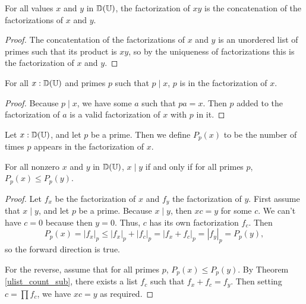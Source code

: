 \documentclass[../../math.tex]{subfiles}
\begin{document}
\begin{theorem} \label{factorization_mult}
    For all values $x$ and $y$ in $\mathbb{D}(\mathbb{U})$, the factorization of $xy$ is the
    concatenation of the factorizations of $x$ and $y$.
\end{theorem}
\begin{proof}
    The concatentation of the factorizations of $x$ and $y$ is an unordered list
    of primes such that its product is $xy$, so by the uniqueness of
    factorizations this is the factorization of $x$ and $y$.
\end{proof}

\begin{theorem} \label{factorization_in}
    For all $x : \mathbb{D}(\mathbb{U})$ and primes $p$ such that $p \mid x$, $p$ is in the
    factorization of $x$.
\end{theorem}
\begin{proof}
    Because $p \mid x$, we have some $a$ such that $pa = x$.  Then $p$ added to
    the factorization of $a$ is a valid factorization of $x$ with $p$ in it.
\end{proof}

\begin{definition}
    Let $x : \mathbb{D}(\mathbb{U})$, and let $p$ be a prime.  Then we define $P_p(x)$ to be the
    number of times $p$ appears in the factorization of $x$.
\end{definition}

\begin{theorem} \label{factorization_powers_div}
    For all nonzero $x$ and $y$ in $\mathbb{D}(\mathbb{U})$, $x \mid y$ if and only if for all
    primes $p$, $P_p(x) \leq P_p(y)$.
\end{theorem}
\begin{proof}
    Let $f_x$ be the factorization of $x$ and $f_y$ the factorization of $y$.
    First assume that $x \mid y$, and let $p$ be a prime.  Because $x \mid y$,
    then $xc = y$ for some $c$.  We can't have $c = 0$ because then $y = 0$.
    Thus, $c$ has its own factorization $f_c$.  Then
    \[
        P_p(x) = |f_x|_p \leq |f_x|_p + |f_c|_p = |f_x + f_c|_p = |f_y|_p =
        P_p(y),
    \]
    so the forward direction is true.

    For the reverse, assume that for all primes $p$, $P_p(x) \leq P_p(y)$.  By
    Theorem \ref{ulist_count_sub}, there exists a list $f_c$ such that $f_x +
    f_c = f_y$.  Then setting $c = \prod f_c$, we have $xc = y$ as required.
\end{proof}
\end{document}
